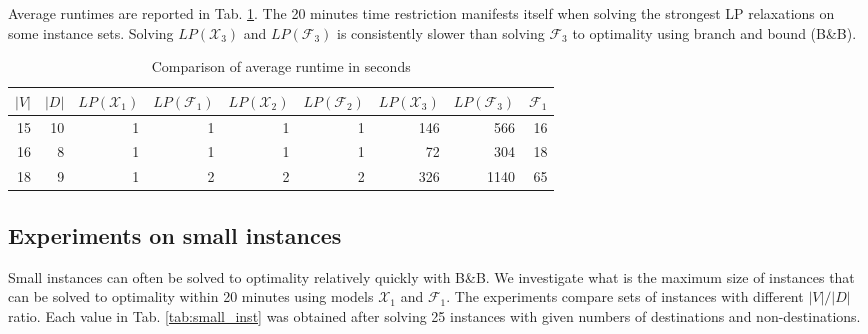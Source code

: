 Average runtimes are reported in Tab. \ref{tab:small_inst_time}.
The 20 minutes time restriction manifests itself when solving the strongest LP relaxations on some instance sets.
Solving $LP(\mathcal{X}_3)$ and $LP(\mathcal{F}_3)$ is consistently slower than solving $\mathcal{F}_3$ to optimality using branch and bound (B\&B).

\begin{table}[h!]
\centering
\setlength{\tabcolsep}{6pt} %
\renewcommand{\arraystretch}{1.4} %
\begin{tabular}{rrrrrrrrr}
 $|V|$ & $|D|$ & $LP(\mathcal{X}_1)$ & $LP(\mathcal{F}_1)$ & $LP(\mathcal{X}_2)$ & $LP(\mathcal{F}_2)$ & $LP(\mathcal{X}_3)$ & $LP(\mathcal{F}_3)$ & $\mathcal{F}_1$\\ \hline
  15 & 10      & 1   & 1   & 1     & 1     & 146 & 566  & 16 \\
  16 & 8       & 1   & 1   & 1     & 1     & 72  & 304  & 18 \\
  18 & 9       & 1   & 2   & 2     & 2     & 326 & 1140 & 65 \\ 
\end{tabular}
\caption{Comparison of average runtime in seconds}
\label{tab:small_inst_time}
\end{table}

\subsection{Experiments on small instances}

Small instances can often be solved to optimality relatively quickly with B\&B.
We investigate what is the maximum size of instances that can be solved to optimality within 20 minutes using models $\mathcal{X}_1$ and $\mathcal{F}_1$.
The experiments compare sets of instances with different $|V|/|D|$ ratio.
Each value in Tab. \ref{tab:small_inst} was obtained after solving 25 instances with given numbers of destinations and non-destinations.
 

